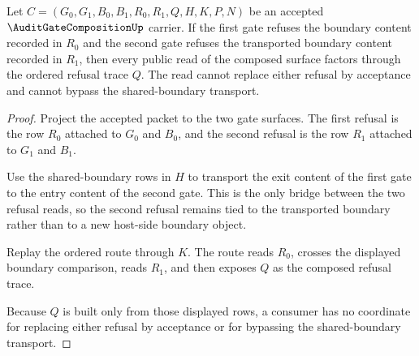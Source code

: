 \begin{theorem}
\label{thm:audit-gate-composition-refusal-transitivity}
Let $C=(G_0,G_1,B_0,B_1,R_0,R_1,Q,H,K,P,N)$ be an accepted
$\AuditGateCompositionUp$ carrier. If the first gate refuses the boundary
content recorded in $R_0$ and the second gate refuses the transported
boundary content recorded in $R_1$, then every public read of the composed
surface factors through the ordered refusal trace $Q$. The read cannot
replace either refusal by acceptance and cannot bypass the shared-boundary
transport.
\end{theorem}
\begin{proof}
Project the accepted packet to the two gate surfaces. The first refusal is
the row $R_0$ attached to $G_0$ and $B_0$, and the second refusal is the row
$R_1$ attached to $G_1$ and $B_1$.

Use the shared-boundary rows in $H$ to transport the exit content of the
first gate to the entry content of the second gate. This is the only bridge
between the two refusal reads, so the second refusal remains tied to the
transported boundary rather than to a new host-side boundary object.

Replay the ordered route through $K$. The route reads $R_0$, crosses the
displayed boundary comparison, reads $R_1$, and then exposes $Q$ as the
composed refusal trace.

Because $Q$ is built only from those displayed rows, a consumer has no
coordinate for replacing either refusal by acceptance or for bypassing the
shared-boundary transport.
\end{proof}

